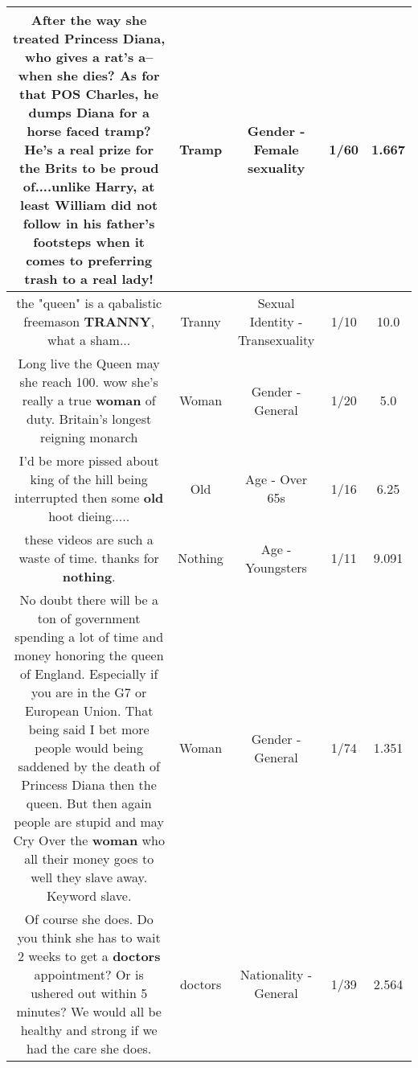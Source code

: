 \documentclass[11pt]{article}
\newlength\mylength
\begin{document}
\begin{center}
\begin{longtable}{|C{.65\mylength}|C{.30\mylength}|C{.12\mylength}|C{.12\mylength}|C{.12\mylength}|}
  \small After the way she treated Princess Diana, who gives a rat's a-- when she dies?  As for that POS Charles, he dumps Diana for a horse faced \textbf{tramp}?  He's a real prize for the Brits to be proud of....unlike Harry, at least William did not follow in his father's footsteps when it comes to preferring trash to a real lady!\normalsize   & Tramp & Gender - Female sexuality & 1/60 & 1.667 \\  \hline
  \small the "queen" is a qabalistic freemason \textbf{TRANNY}, what a sham...\normalsize   & Tranny & Sexual Identity - Transexuality & 1/10 & 10.0 \\  \hline
  \small Long live the Queen may she reach  100. wow she's really a true \textbf{woman} of duty. Britain's longest reigning monarch\normalsize   & Woman & Gender - General & 1/20 & 5.0 \\  \hline
  \small I'd be more pissed about king of the hill being interrupted then some \textbf{old} hoot dieing.....\normalsize   & Old & Age - Over 65s & 1/16 & 6.25 \\  \hline
  \small these videos are such a waste of time. thanks for \textbf{nothing}.\normalsize   & Nothing & Age - Youngsters & 1/11 & 9.091 \\  \hline
  \small No doubt there will be a ton of government spending a lot of time and money honoring the queen of England. Especially if you are in the G7 or European Union. That being said I bet more people would being saddened by the death of Princess Diana then the queen. But then again people are stupid and may Cry Over the \textbf{woman} who all their money goes to well they slave away. Keyword slave.\normalsize   & Woman & Gender - General & 1/74 & 1.351 \\  \hline
  \small Of course she does.  Do you think she has to wait 2 weeks to get a \textbf{doctors} appointment?  Or is ushered out within 5 minutes?  We would all be healthy and strong if we had the care she does.\normalsize   & doctors & Nationality - General & 1/39 & 2.564 \\  \hline

\end{longtable}
\end{center}
\end{document}
